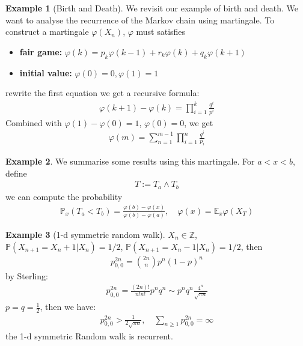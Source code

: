 \documentclass[a4paper,11pt]{book}
\theoremstyle{definition}
\newtheorem*{example}{Example}
\theoremstyle{remark}
\begin{document}
\begin{example}[Birth and Death]
We revisit our example of birth and death. We want to analyse the recurrence of the Markov chain using martingale. To construct a martingale $\varphi(X_n)$, $\varphi$ must satisfies
\begin{itemize}
	\item \textbf{fair game:} $\varphi(k) = p_k\varphi(k-1) + r_k\varphi(k) + q_k\varphi(k+1)$
	\item \textbf{initial value:} $\varphi(0) = 0, \varphi(1) = 1$
\end{itemize}
rewrite the first equation we get a recursive formula:
\begin{align*}
	\varphi(k+1) - \varphi(k) = \prod_{i = 1}^k \frac{q^i}{p^i}
\end{align*}
Combined with $\varphi(1) - \varphi(0) = 1$, $\varphi(0) = 0$, we get
\begin{align*}
	\varphi(m) = \sum_{n = 1}^{m-1} \prod_{i= 1}^n \frac{q^i}{p_i}
\end{align*}
\end{example}

\begin{example}
We summarise some results using this martingale. For $a < x < b$, define
\begin{align*}
	T:= T_a \wedge T_b
\end{align*}
we can compute the probability 
\begin{align*}
	\mathbb{P}_x (T_a < T_b) = \frac{\varphi(b) - \varphi(x)}{\varphi(b) - \varphi(a)}, \quad \varphi(x) = \mathbb{E}_x \varphi(X_T)
\end{align*}
\end{example}

\begin{example}[1-d symmetric random walk]
	$X_n \in \mathbb{Z}$, $\mathbb{P}(X_{n+1} = X_n + 1|X_n) = 1\slash 2$,  $\mathbb{P}(X_{n+1} = X_n - 1|X_n) = 1\slash 2$, then
	\begin{align*}
		p_{0, 0}^{2n} = \binom{2n}{n} p^n(1-p)^n
	\end{align*}
	by Sterling:
	\begin{align*}
		p_{0, 0}^{2n} = \frac{(2n)!}{n!n!}p^n q^n \sim p^n q^n\frac{4^n}{\sqrt{\pi n}} 
	\end{align*}
	$p = q = \frac{1}{2}$, then we have:
	\begin{align*}
		 p_{0, 0}^{2n} > \frac{1}{2 \sqrt{\pi n}}, \quad  \sum_{n \geq 1} p_{0, 0}^{2n} = \infty
	\end{align*}
	the 1-d symmetric Random walk is recurrent.	
\end{example}
\end{document}
